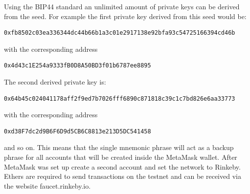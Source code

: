 Using the BIP44\cite{bip44} standard an unlimited amount of private keys can be derived from the seed. For example the first private key derived from this seed would be:
\begin{lstlisting}[language=bash, numbers=none]
  0xfb8502c03ea336344dc44b66b1a3c01e2917138e92bfa93c54725166394cd46b
\end{lstlisting}
with the corresponding address
\begin{lstlisting}[language=bash, numbers=none]
  0x4d43c1E254a9333fB0D8A50BD3f01b6787ee8895
\end{lstlisting}
The second derived private key is:
\begin{lstlisting}[language=bash, numbers=none]
  0x64b45c024041178aff2f9ed7b7026fff6890c871818c39c1c7bd826e6aa33773
\end{lstlisting}
with the corresponding address
\begin{lstlisting}[language=bash, numbers=none]
  0xd38F7dc2d9B6F6D9d5CB6C8813e213D5DC541458
\end{lstlisting}
and so on. This means that the single mnemonic phrase will act as a backup phrase for all accounts that will be created inside the MetaMask wallet.
After MetaMask was set up create a second account and set the network to Rinkeby. Ethers are required to send transactions on the testnet and can be received via the website faucet.rinkeby.io. 
\\
